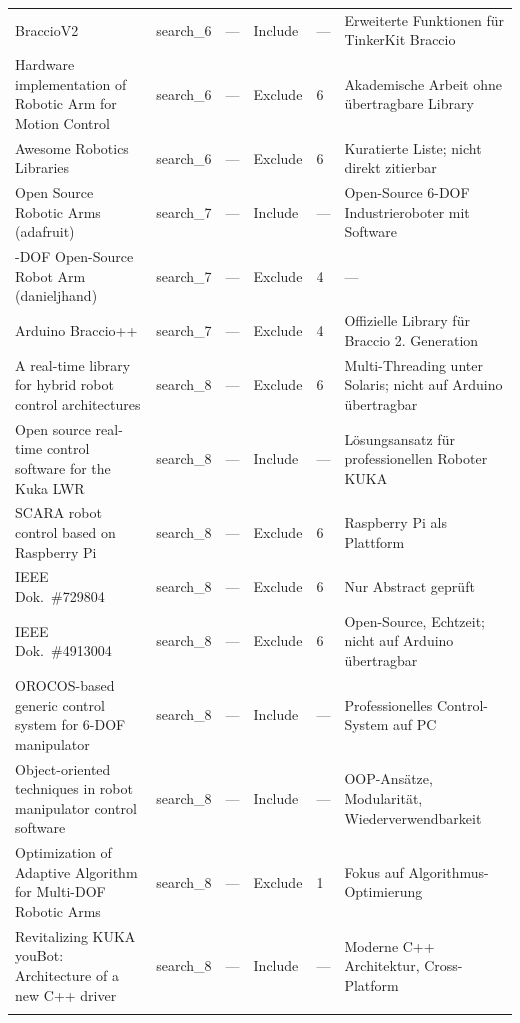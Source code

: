 \documentclass[12pt,a4paper]{article}
\begin{document}
\begin{landscape}
\begin{longtable}{p{5.5cm} l l l l p{5.5cm}}
\addlinespace
BraccioV2
  & search\_6 & — & Include & — & Erweiterte Funktionen für TinkerKit Braccio \\
\addlinespace
Hardware implementation of Robotic Arm for Motion Control
  & search\_6 & — & Exclude & 6 & Akademische Arbeit ohne übertragbare Library \\
\addlinespace
Awesome Robotics Libraries
  & search\_6 & — & Exclude & 6 & Kuratierte Liste; nicht direkt zitierbar \\
\addlinespace
Open Source Robotic Arms (adafruit)
  & search\_7 & — & Include & — & Open-Source 6-DOF Industrieroboter mit Software \\
\addlinespace
6-DOF Open-Source Robot Arm (danieljhand)
  & search\_7 & — & Exclude & 4 & — \\
\addlinespace
Arduino Braccio++
  & search\_7 & — & Exclude & 4 & Offizielle Library für Braccio 2. Generation \\
\addlinespace
A real-time library for hybrid robot control architectures
  & search\_8 & — & Exclude & 6 & Multi-Threading unter Solaris; nicht auf Arduino übertragbar \\
\addlinespace
Open source real-time control software for the Kuka LWR
  & search\_8 & — & Include & — & Lösungsansatz für professionellen Roboter KUKA \\
\addlinespace
SCARA robot control based on Raspberry Pi
  & search\_8 & — & Exclude & 6 & Raspberry Pi als Plattform \\
\addlinespace
IEEE Dok.\ \#729804
  & search\_8 & — & Exclude & 6 & Nur Abstract geprüft \\
\addlinespace
IEEE Dok.\ \#4913004
  & search\_8 & — & Exclude & 6 & Open-Source, Echtzeit; nicht auf Arduino übertragbar \\
\addlinespace
OROCOS-based generic control system for 6-DOF manipulator
  & search\_8 & — & Include & — & Professionelles Control-System auf PC \\
\addlinespace
Object-oriented techniques in robot manipulator control software
  & search\_8 & — & Include & — & OOP-Ansätze, Modularität, Wiederverwendbarkeit \\
\addlinespace
Optimization of Adaptive Algorithm for Multi-DOF Robotic Arms
  & search\_8 & — & Exclude & 1 & Fokus auf Algorithmus-Optimierung \\
\addlinespace
Revitalizing KUKA youBot: Architecture of a new C++ driver
  & search\_8 & — & Include & — & Moderne C++ Architektur, Cross-Platform \\
\addlinespace

\end{longtable}
\end{landscape}
\end{document}

